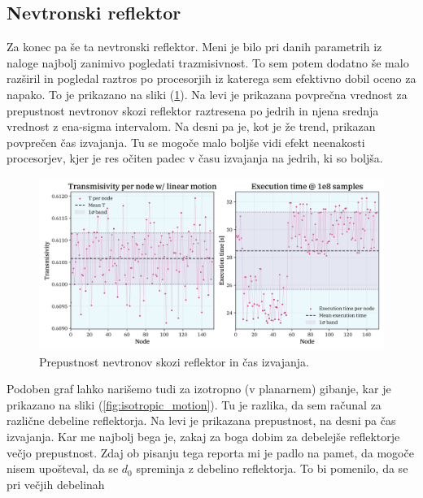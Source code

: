 \documentclass[a4paper]{article}
\begin{document}
\subsection{Nevtronski reflektor}
Za konec pa še ta nevtronski reflektor. Meni je bilo pri danih parametrih iz naloge najbolj zanimivo pogledati
trazmisivnost. To sem potem dodatno še malo razširil in pogledal raztros po procesorjih iz katerega sem efektivno dobil 
oceno za napako. To je prikazano na sliki (\ref{fig:linear_motion}). Na levi je prikazana povprečna vrednost za prepustnost
nevtronov skozi reflektor raztresena po jedrih in njena srednja vrednost z ena-sigma intervalom. Na desni pa je, kot je 
že trend, prikazan povprečen čas izvajanja. Tu se mogoče malo boljše vidi efekt neenakosti procesorjev, kjer je 
res očiten padec v času izvajanja na jedrih, ki so boljša. \\

\begin{figure}[H]
    \centering
    \includegraphics[width=\textwidth]{../NeutronReflector/Images/linear_motion.png}
    \caption{Prepustnost nevtronov skozi reflektor in čas izvajanja.}
    \label{fig:linear_motion}
\end{figure}

Podoben graf lahko narišemo tudi za izotropno (v planarnem) gibanje, kar je prikazano na sliki (\ref{fig:isotropic_motion}).
Tu je razlika, da sem računal za različne debeline reflektorja. Na levi je prikazana prepustnost, na desni pa čas izvajanja.
Kar me najbolj bega je, zakaj za boga dobim za debelejše reflektorje večjo prepustnost. Zdaj ob pisanju tega reporta mi je
padlo na pamet, da mogoče nisem upošteval, da se $d_0$ spreminja z debelino reflektorja. To bi pomenilo, da se pri večjih debelinah
\end{document}
